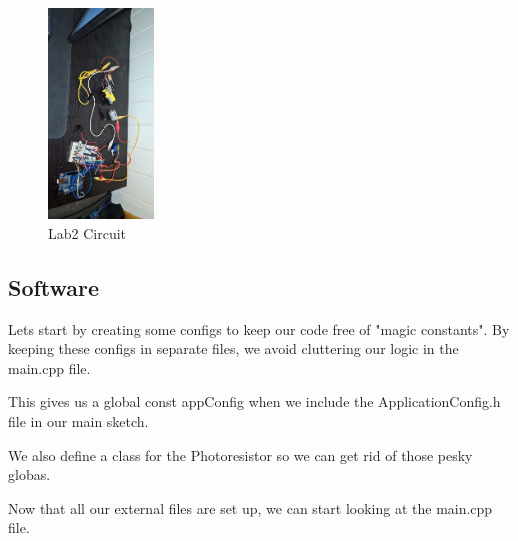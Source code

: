 \documentclass[journal]{IEEEtran}
\begin{document}
\begin{figure}[H]
    \begin {center}
    \includegraphics[width=0.25\textwidth, angle=90]{images/circuit-picture.jpg}
    \caption{Lab2 Circuit}
    \label{fig:circuitPicture}
    \end {center}
\end{figure}

\vfill\null
\pagebreak

\subsection{Software}
Lets start by creating some configs to keep our code free of "magic constants".
By keeping these configs in separate files, we avoid cluttering our logic in the main.cpp file.\\





\vfill\null
\pagebreak



This gives us a global const appConfig when we include the ApplicationConfig.h file
in our main sketch.

\vfill\null
\pagebreak

\onecolumn

We also define a class for the Photoresistor so we can get rid of those pesky globas.


\vfill\null
\pagebreak

Now that all our external files are set up, we can start looking at the main.cpp file.

\end{document}
